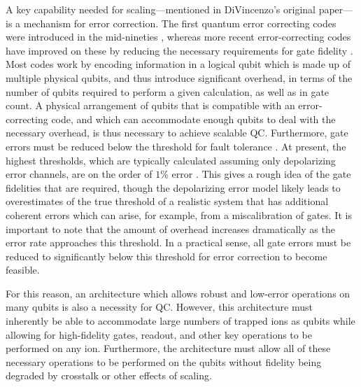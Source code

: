 \documentclass[%
12pt,
 amsmath,amssymb,
]{revtex4-2}
\begin{document}
A key capability needed for scaling---mentioned in DiVincenzo's original paper---is a mechanism for error correction. The first quantum error correcting codes were introduced in the mid-nineties \cite{PhysRevA.52.R2493,CalderbankErrorCorrection1996,SteaneErrorCorrection1996}, whereas more recent error-correcting codes have improved on these by reducing the necessary requirements for gate fidelity \cite{RaussendorfSurfaceCode2007}. Most codes work by encoding information in a logical qubit which is made up of multiple physical qubits, and thus introduce significant overhead, in terms of the number of qubits required to perform a given calculation, as well as in gate count. A physical arrangement of qubits that is compatible with an error-correcting code, and which can accommodate enough qubits to deal with the necessary overhead, is thus necessary to achieve scalable QC. Furthermore, gate errors must be reduced below the threshold for fault tolerance \cite{GottesmanFTQC1998}. At present, the highest thresholds, which are typically calculated assuming only depolarizing error channels, are on the order of $1 \%$ error \cite{RaussendorfSurfaceCode2007}.  This gives a rough idea of the gate fidelities that are required, though the depolarizing error model likely leads to overestimates of the true threshold of a realistic system that has additional coherent errors which can arise, for example, from a miscalibration of gates. It is important to note that the amount of overhead increases dramatically as the error rate approaches this threshold. In a practical sense, all gate errors must be reduced to significantly below this threshold for error correction to become feasible.

For this reason, an architecture which allows robust and low-error operations on many qubits is also a necessity for QC. However, this architecture must inherently be able to accommodate large numbers of trapped ions as qubits while allowing for high-fidelity gates, readout, and other key operations to be performed on any ion. Furthermore, the architecture must allow all of these necessary operations to be performed on the qubits without fidelity being degraded by crosstalk or other effects of scaling.
\end{document}
